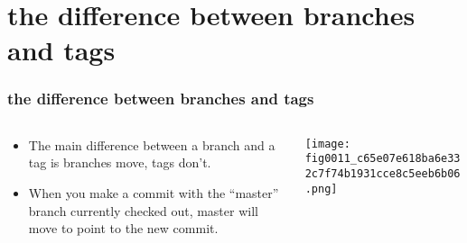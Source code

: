 \documentclass[presentation]{beamer}
\begin{document}
\section{the difference between branches and tags}
\label{sec-4}
\begin{frame}
\frametitle{the difference between branches and tags}
\label{sec-4-1}
\begin{columns}
\begin{column}{0.6\textwidth}
\label{sec-4-1-1}


\begin{itemize}
\item The main difference between a branch and a tag is branches move, tags don't.
\item When you make a commit with the ``master'' branch currently checked out, master
  will move to point to the new commit.
\end{itemize}
\end{column}
\begin{column}{0.4\textwidth}
\label{sec-4-1-2}


\texttt{[image: fig0011\_c65e07e618ba6e332c7f74b1931cce8c5eeb6b06.png]}
\end{column}
\end{columns}
\end{frame}
\end{document}
